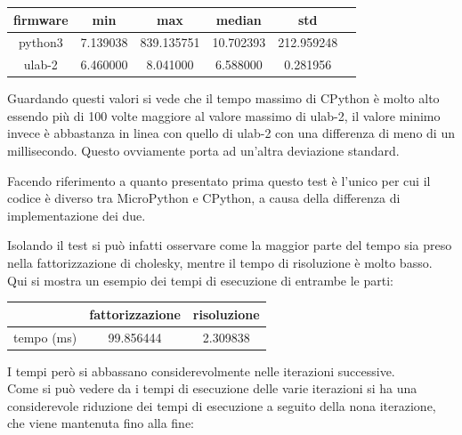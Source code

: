 \documentclass[12pt,a4paper]{report}
\begin{document}
\begin{center}
\begin{tabular}{|c | c | c | c | c | c |}
\hline
firmware & min & max & median & std \\
\hline
python3 & 7.139038 & 839.135751 & 10.702393 &212.959248 \\
ulab-2 & 6.460000 & 8.041000 & 6.588000 & 0.281956 \\
\hline
\end{tabular}
\end{center}

Guardando questi valori si vede che il tempo massimo di CPython è molto
alto essendo più di 100 volte maggiore al valore massimo di ulab-2, il
valore minimo invece è abbastanza in linea con quello di ulab-2 con una
differenza di meno di un millisecondo. Questo ovviamente porta ad
un'altra deviazione standard.

Facendo riferimento a quanto presentato prima questo test è
l'unico per cui il codice è diverso tra MicroPython e
CPython, a causa della differenza di implementazione dei due.

Isolando il test si può infatti osservare come la maggior parte del
tempo sia preso nella fattorizzazione di cholesky, mentre il tempo di
risoluzione è molto basso.\\
Qui si mostra un esempio dei tempi di esecuzione di entrambe le parti:

\begin{center}
\begin{tabular}{|c | c | c |}
\hline
 &fattorizzazione & risoluzione \\
\hline
tempo (ms) & 99.856444 & 2.309838 \\
\hline
\end{tabular}
\end{center}

I tempi però si abbassano considerevolmente nelle iterazioni
successive.\\
Come si può vedere da i tempi di esecuzione delle varie iterazioni si ha
una considerevole riduzione dei tempi di esecuzione a seguito della nona
iterazione, che viene mantenuta fino alla fine:
\end{document}
